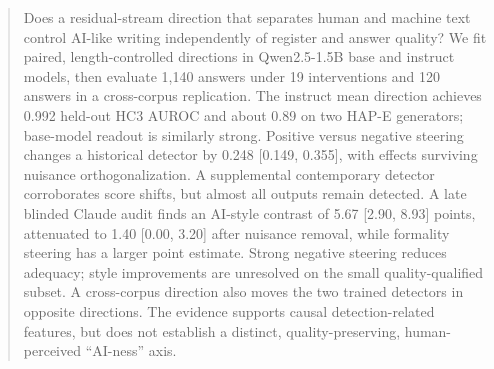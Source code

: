 \begin{abstract}
Does a residual-stream direction that separates human and machine text control AI-like writing independently of register and answer quality? We fit paired, length-controlled directions in Qwen2.5-1.5B base and instruct models, then evaluate 1,140 answers under 19 interventions and 120 answers in a cross-corpus replication. The instruct mean direction achieves 0.992 held-out HC3 AUROC and about 0.89 on two HAP-E generators; base-model readout is similarly strong. Positive versus negative steering changes a historical detector by 0.248 [0.149, 0.355], with effects surviving nuisance orthogonalization. A supplemental contemporary detector corroborates score shifts, but almost all outputs remain detected. A late blinded Claude audit finds an AI-style contrast of 5.67 [2.90, 8.93] points, attenuated to 1.40 [0.00, 3.20] after nuisance removal, while formality steering has a larger point estimate. Strong negative steering reduces adequacy; style improvements are unresolved on the small quality-qualified subset. A cross-corpus direction also moves the two trained detectors in opposite directions. The evidence supports causal detection-related features, but does not establish a distinct, quality-preserving, human-perceived ``AI-ness'' axis.
\end{abstract}
